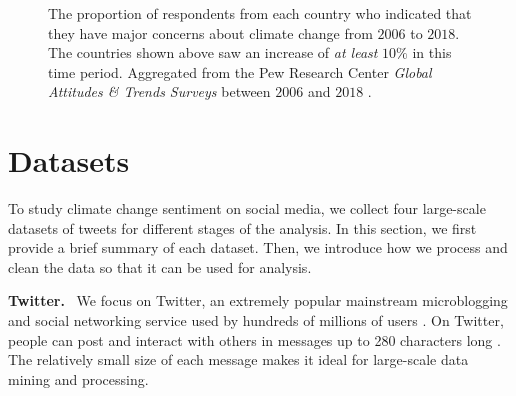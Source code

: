 \documentclass{paper}
\newcommand{\inlineSection}[1]{\vspace{0.5em}\noindent\textbf{#1.}~}
\begin{document}
\begin{figure}[!hpb]
    \centering
    \caption{The proportion of respondents from each country who indicated that they have major concerns about climate change from $2006$ to $2018$. The countries shown above saw an increase of \textit{at least} $10\%$ in this time period. Aggregated from the Pew Research Center \textit{Global Attitudes \& Trends Surveys} between $2006$ and $2018$ \cite{PRC:GlobalSurvey}.}
    \label{fig:climate_concern_over_time_International}
\end{figure}

\section{Datasets}
\label{sec:datasets}

To study climate change sentiment on social media, we collect four large-scale datasets of tweets for different stages of the analysis. In this section, we first provide a brief summary of each dataset. Then, we introduce how we process and clean the data so that it can be used for analysis.

\inlineSection{Twitter} We focus on Twitter, an extremely popular mainstream microblogging and social networking service used by hundreds of millions of users \cite{twitter_active_users}. On Twitter, people can post and interact with others in messages up to 280 characters long \cite{twitter_max_char_docs}. The relatively small size of each message makes it ideal for large-scale data mining and processing.
\end{document}
